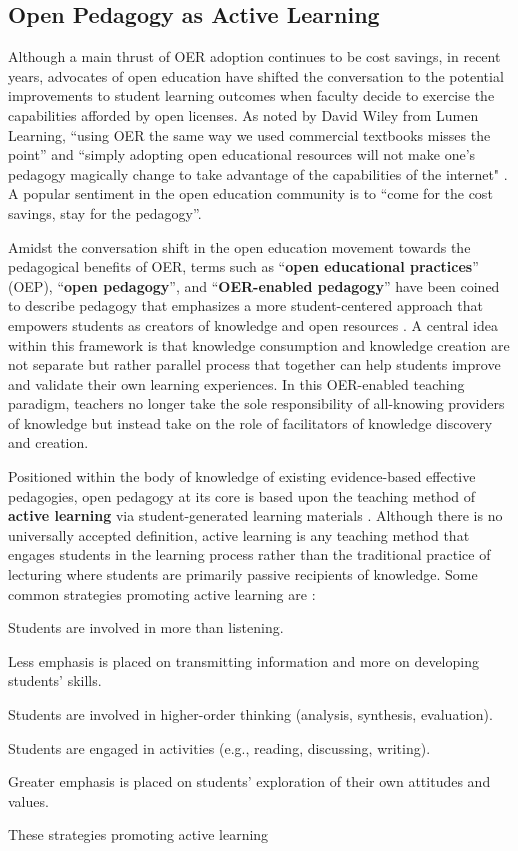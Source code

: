\documentclass[11pt]{article}
\begin{document}
\subsection{Open Pedagogy as Active Learning}
Although a main thrust of OER adoption continues to be cost savings, in recent years, advocates of open education have shifted the conversation to the potential improvements to student learning outcomes when faculty decide to exercise the capabilities afforded by open licenses.  As noted by David Wiley from Lumen Learning, ``using OER the same way we used commercial textbooks misses the point'' and ``simply adopting open educational resources will not make one's pedagogy magically change to take advantage of the capabilities of the internet" \cite{DW:13}.  A popular sentiment in the open education community is to ``come for the cost savings, stay for the pedagogy''.

Amidst the conversation shift in the open education movement towards the pedagogical benefits of OER, terms such as ``\textbf{open educational practices}'' (OEP), ``\textbf{open pedagogy}'', and ``\textbf{OER-enabled pedagogy}'' have been coined to describe pedagogy that emphasizes a more student-centered approach that empowers students as creators of knowledge and open resources \cite{EM:17, DW:13, DW-JH:18}.  A central idea within this framework is that knowledge consumption and knowledge creation are not separate but rather parallel process that together can help students improve and validate their own learning experiences.  In this OER-enabled teaching paradigm, teachers no longer take the sole responsibility of all-knowing providers of knowledge but instead take on the role of facilitators of knowledge discovery and creation.

Positioned within the body of knowledge of existing evidence-based effective pedagogies, open pedagogy at its core is based upon the teaching method of \textbf{active learning} via student-generated learning materials \cite{CB-JE:91, MC:09, MC-MB-ML:89, SF-SE-MM:14, MP:04}.  Although there is no universally accepted definition, active learning is any teaching method that engages students in the learning process rather than the traditional practice of lecturing where students are primarily passive recipients of knowledge. Some common strategies promoting active learning are \cite{CB-JE:91}:
\begin{compactitem}
  \item Students are involved in more than listening.
  \item Less emphasis is placed on transmitting information and
  more on developing students' skills.
  \item Students are involved in higher-order thinking (analysis,
  synthesis, evaluation).
  \item Students are engaged in activities (e.g., reading, discussing, writing).
  \item Greater emphasis is placed on students' exploration of
  their own attitudes and values.
\end{compactitem}
These strategies promoting active learning 
\end{document}

